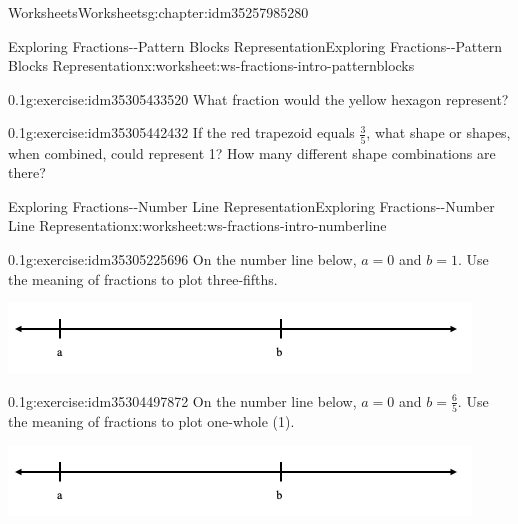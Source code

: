 \documentclass[twoside,11pt,]{book}
\begin{document}
\begin{chapterptx}{Worksheets}{}{Worksheets}{}{}{g:chapter:idm35257985280}
\begin{worksheet-section-numberless}{Exploring Fractions-{}-{}Pattern Blocks Representation}{}{Exploring Fractions-{}-{}Pattern Blocks Representation}{}{}{x:worksheet:ws-fractions-intro-patternblocks}
\begin{divisionexercise}{9}{}{0.1}{g:exercise:idm35305433520}
What fraction would the yellow hexagon represent?%
\end{divisionexercise}%
\begin{divisionexercise}{10}{}{0.1}{g:exercise:idm35305442432}%
If the red trapezoid equals \(\frac{3}{5} \), what shape or shapes, when combined, could represent 1?  How many different shape combinations are there?%
\end{divisionexercise}%
\end{worksheet-section-numberless}
\restoregeometry
%
%
\typeout{************************************************}
\typeout{************************************************}
%
\begin{worksheet-section-numberless}{Exploring Fractions-{}-{}Number Line Representation}{}{Exploring Fractions-{}-{}Number Line Representation}{}{}{x:worksheet:ws-fractions-intro-numberline}
\begin{divisionexercise}{1}{}{0.1}{g:exercise:idm35305225696}%
On the number line below, \(a= 0 \) and \(b=1 \).  Use the meaning of fractions to plot three-fifths.%
\begin{sidebyside}{1}{0}{0}{0}%
\begin{sbspanel}{1}%
\includegraphics[width=1\linewidth]{images/fractions-number-line.png}
\end{sbspanel}%
\end{sidebyside}%
\end{divisionexercise}%
\begin{divisionexercise}{2}{}{0.1}{g:exercise:idm35304497872}%
On the number line below, \(a= 0 \) and \(b=\frac{6}{5} \).  Use the meaning of fractions to plot one-whole (1).%
\begin{sidebyside}{1}{0}{0}{0}%
\begin{sbspanel}{1}%
\includegraphics[width=1\linewidth]{images/fractions-number-line.png}
\end{sbspanel}%
\end{sidebyside}%

\end{divisionexercise}
\end{worksheet-section-numberless}
\end{chapterptx}
\end{document}
